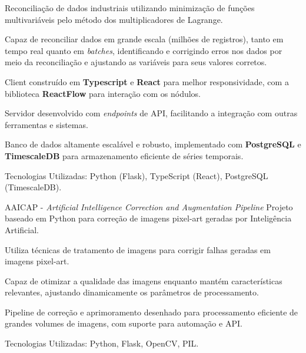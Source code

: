       \resumeItemListStart
        \item Reconciliação de dados industriais utilizando minimização de funções multivariáveis pelo método dos multiplicadores de Lagrange.
        \item {Capaz de reconciliar dados em grande escala (milhões de registros), tanto em tempo real quanto em \textit{batches}, identificando e corrigindo erros nos dados por meio da reconciliação e ajustando as variáveis para seus valores corretos.}
        \item {Client construído em \textbf{Typescript} e \textbf{React} para melhor responsividade, com a biblioteca \textbf{ReactFlow} para interação com os nódulos.}
        \item {Servidor desenvolvido com \textit{endpoints} de API, facilitando a integração com outras ferramentas e sistemas.}
        \item {Banco de dados altamente escalável e robusto, implementado com \textbf{PostgreSQL} e \textbf{TimescaleDB} para armazenamento eficiente de séries temporais.}
        \item {Tecnologias Utilizadas: Python (Flask), TypeScript (React), PostgreSQL (TimescaleDB).}
      \resumeItemListEnd

       \resumeProject
      { AAICAP - \textit{Artificial Intelligence Correction and Augmentation Pipeline}}
      {Projeto baseado em Python para correção de imagens pixel-art geradas por Inteligência Artificial.}
      {}

      \resumeItemListStart
        \item {Utiliza técnicas de tratamento de imagens para corrigir falhas geradas em imagens pixel-art.}
        \item {Capaz de otimizar a qualidade das imagens enquanto mantém características relevantes, ajustando dinamicamente os parâmetros de processamento.}
        \item {Pipeline de correção e aprimoramento desenhado para processamento eficiente de grandes volumes de imagens, com suporte para automação e API.}
        
        \item {Tecnologias Utilizadas: Python, Flask, OpenCV, PIL.}
      \resumeItemListEnd
      
  \resumeSubHeadingListEnd
\vspace{-8.5mm}

